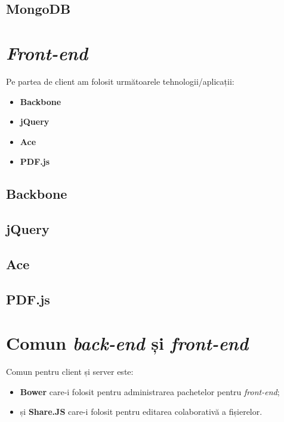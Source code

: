 \documentclass[a4wide,12pt]{report}
\newcommand{\eng}[1]{\emph{#1}} %
\begin{document}
\subsection{MongoDB}

\section{\eng{Front-end}}

Pe partea de client am folosit următoarele tehnologii/aplicații:

\begin{itemize}

\item \textbf{Backbone}

\item \textbf{jQuery}

\item \textbf{Ace}

\item \textbf{PDF.js}

\end{itemize}

\subsection{Backbone}

\subsection{jQuery}

\subsection{Ace}

\subsection{PDF.js}

\section{Comun \eng{back-end} și \eng{front-end}}

Comun pentru client și server este:

\begin{itemize}

\item \textbf{Bower} care-i folosit pentru administrarea pachetelor pentru
\eng{front-end};

\item și \textbf{Share.JS} care-i folosit pentru editarea colaborativă a
fișierelor.

\end{itemize}
\end{document}
